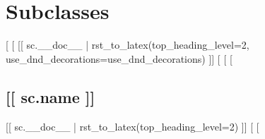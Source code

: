 \section*{Subclasses}
[%
  [%
\DndFeatHeader{[[ sc.name ]]} %
[[ sc.__doc__ | rst_to_latex(top_heading_level=2, use_dnd_decorations=use_dnd_decorations) ]]
    [%
[%
    [%
\subsection*{[[ sc.name ]]}
[[ sc.__doc__ | rst_to_latex(top_heading_level=2) ]]
    [%
[%
